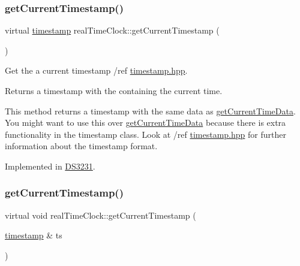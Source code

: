 \subsubsection{\texorpdfstring{get\+Current\+Timestamp()}{getCurrentTimestamp()}\hspace{0.1cm}{\footnotesize\ttfamily [1/2]}}
{\footnotesize\ttfamily virtual \mbox{\hyperlink{classtimestamp}{timestamp}} real\+Time\+Clock\+::get\+Current\+Timestamp (\begin{DoxyParamCaption}{ }\end{DoxyParamCaption})\hspace{0.3cm}{\ttfamily [pure virtual]}}



Get the a current timestamp /ref \mbox{\hyperlink{timestamp_8hpp_source}{timestamp.\+hpp}}. 

\begin{DoxyReturn}{Returns}
a timestamp with the containing the current time.
\end{DoxyReturn}
This method returns a timestamp with the same data as \mbox{\hyperlink{classreal_time_clock_a2d1613b3cd572f62bc9faaea6a0f82f2}{get\+Current\+Time\+Data}}. You might want to use this over \mbox{\hyperlink{classreal_time_clock_a2d1613b3cd572f62bc9faaea6a0f82f2}{get\+Current\+Time\+Data}} because there is extra functionality in the timestamp class. Look at /ref \mbox{\hyperlink{timestamp_8hpp_source}{timestamp.\+hpp}} for further information about the timestamp format. 

Implemented in \mbox{\hyperlink{class_d_s3231_a04e087a918d2d48b0cdd2e3c6c2f595f}{D\+S3231}}.

\mbox{\label{classreal_time_clock_aa7402c5941b089d4e86b2af20d48b7ba}} 
\subsubsection{\texorpdfstring{get\+Current\+Timestamp()}{getCurrentTimestamp()}\hspace{0.1cm}{\footnotesize\ttfamily [2/2]}}
{\footnotesize\ttfamily virtual void real\+Time\+Clock\+::get\+Current\+Timestamp (\begin{DoxyParamCaption}\item[{\mbox{\hyperlink{classtimestamp}{timestamp}} \&}]{ts }\end{DoxyParamCaption})\hspace{0.3cm}{\ttfamily [pure virtual]}}



